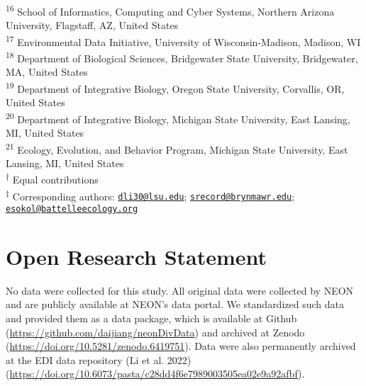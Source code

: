 \documentclass[
  12pt,
]{article}
\begin{document}
\textsuperscript{16} School of Informatics, Computing and Cyber Systems, Northern Arizona University, Flagstaff, AZ, United States\\
\textsuperscript{17} Environmental Data Initiative, University of Wisconsin-Madison, Madison, WI\\
\textsuperscript{18} Department of Biological Sciences, Bridgewater State University, Bridgewater, MA, United States\\
\textsuperscript{19} Department of Integrative Biology, Oregon State University, Corvallis, OR, United States\\
\textsuperscript{20} Department of Integrative Biology, Michigan State University, East Lansing, MI, United States\\
\textsuperscript{21} Ecology, Evolution, and Behavior Program, Michigan State University, East Lansing, MI, United States\\
\textsuperscript{†} Equal contributions\\
\textsuperscript{‡} Corresponding authors: \href{mailto:dli30@lsu.edu}{\nolinkurl{dli30@lsu.edu}}; \href{mailto:srecord@brynmawr.edu}{\nolinkurl{srecord@brynmawr.edu}}; \href{mailto:esokol@battelleecology.org}{\nolinkurl{esokol@battelleecology.org}}

\normalsize

\hypertarget{open-research-statement}{%
\section{Open Research Statement}\label{open-research-statement}}

No data were collected for this study. All original data were collected by NEON and are publicly available at NEON's data portal. We standardized such data and provided them as a data package, which is available at Github (\url{https://github.com/daijiang/neonDivData}) and archived at Zenodo (\url{https://doi.org/10.5281/zenodo.6419751}). Data were also permanently archived at the EDI data repository (Li et al. 2022) (\url{https://doi.org/10.6073/pasta/c28dd4f6e7989003505ea02e9a92afbf}).
\end{document}
